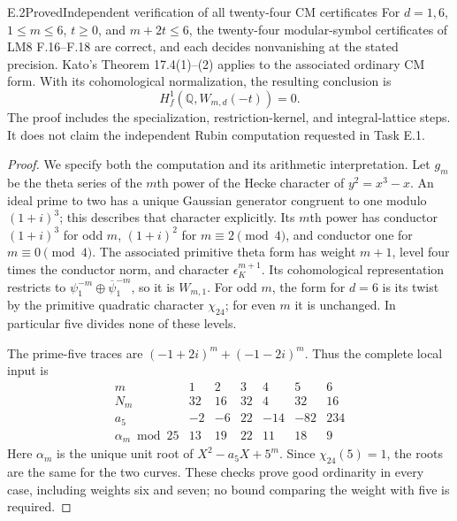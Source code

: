 \begin{statement}{E.2}{Proved}{Independent verification of all twenty-four CM certificates}
For \(d=1,6\), \(1\le m\le6\), \(t\ge0\), and
\(m+2t\le6\), the twenty-four modular-symbol certificates
of LM8 F.16--F.18 are correct, and each decides nonvanishing
at the stated precision. Kato's Theorem 17.4(1)--(2) applies
to the associated ordinary CM form. With its cohomological
normalization, the resulting conclusion is
\[
 H_f^1(\mathbb Q,W_{m,d}(-t))=0.                        \tag{E.2.1}
\]
The proof includes the specialization, restriction-kernel,
and integral-lattice steps. It does not claim the independent
Rubin computation requested in Task E.1.
\end{statement}
\begin{proof}
We specify both the computation and its arithmetic interpretation.
Let \(g_m\) be the theta series of the \(m\)th power of the
Hecke character of \(y^2=x^3-x\). An ideal prime to two has
a unique Gaussian generator congruent to one modulo
\((1+i)^3\); this describes that character explicitly.
Its \(m\)th power has conductor \((1+i)^3\) for odd \(m\),
\((1+i)^2\) for \(m\equiv2\pmod4\), and conductor one
for \(m\equiv0\pmod4\). The associated primitive theta
form has weight \(m+1\), level four times the conductor
norm, and character \(\epsilon_K^{m+1}\). Its
cohomological representation restricts to
\(\psi_1^{-m}\oplus\overline\psi_1^{-m}\), so it is
\(W_{m,1}\). For odd \(m\), the form for \(d=6\) is
its twist by the primitive quadratic character \(\chi_{24}\);
for even \(m\) it is unchanged. In particular five divides
none of these levels.

The prime-five traces are
\((-1+2i)^m+(-1-2i)^m\). Thus the complete local input is
\[
\begin{array}{c|rrrrrr}
m&1&2&3&4&5&6\\\hline
N_m&32&16&32&4&32&16\\
a_5&-2&-6&22&-14&-82&234\\
\alpha_m\bmod25&13&19&22&11&18&9
\end{array}                                                   \tag{E.2.2}
\]
Here \(\alpha_m\) is the unique unit root of
\(X^2-a_5X+5^m\). Since \(\chi_{24}(5)=1\), the roots
are the same for the two curves. These checks prove good
ordinarity in every case, including weights six and seven;
no bound comparing the weight with five is required.


\end{proof}
